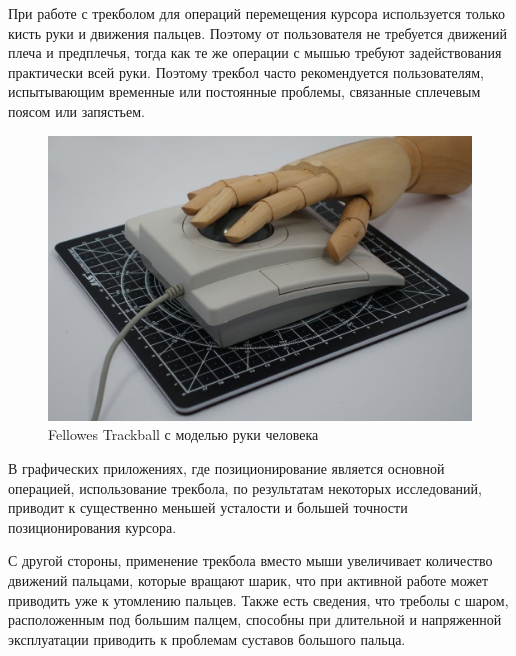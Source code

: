 \documentclass[11pt, a4paper]{article}
\begin{document}
При работе с трекболом для операций перемещения курсора используется только кисть руки и движения пальцев. Поэтому от пользователя не требуется движений плеча и предплечья, тогда как те же операции с мышью требуют задействования практически всей руки. 
  Поэтому трекбол часто рекомендуется пользователям, испытывающим временные или постоянные проблемы, связанные сплечевым поясом или запястьем.

\begin{figure}[h]
    \centering
    \includegraphics[scale=0.3]{1997_fellowes_trackball/fellowset2.jpg}
    \caption{Fellowes Trackball с моделью руки человека}
    \label{fig:hand}
\end{figure}

В графических приложениях, где позиционирование является основной операцией, использование трекбола, по результатам некоторых исследований, приводит к существенно меньшей усталости и большей точности позиционирования курсора. 

С другой стороны, применение трекбола вместо мыши увеличивает количество движений пальцами, которые вращают шарик, что при активной работе может приводить уже к утомлению пальцев. Также есть сведения, что треболы с шаром, расположенным под большим палцем, способны при длительной и напряженной эксплуатации приводить к проблемам суставов большого пальца.


%    
\end{document}

